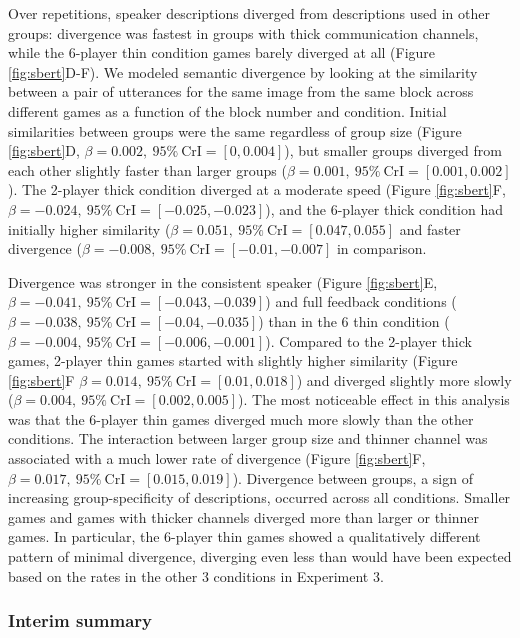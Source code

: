\documentclass[
  english,
  a4paper,
]{article}
\begin{document}
Over repetitions, speaker descriptions diverged from descriptions used in other groups: divergence was fastest in groups with thick communication channels, while the 6-player thin condition games barely diverged at all (Figure \ref{fig:sbert}D-F).
We modeled semantic divergence by looking at the similarity between a pair of utterances for the same image from the same block across different games as a function of the block number and condition.
Initial similarities between groups were the same regardless of group size (Figure \ref{fig:sbert}D, \(\beta=0.002,\:95\%\:\mathrm{CrI}=[0, 0.004]\)), but smaller groups diverged from each other slightly faster than larger groups (\(\beta=0.001,\:95\%\:\mathrm{CrI}=[0.001, 0.002]\)).
The 2-player thick condition diverged at a moderate speed (Figure \ref{fig:sbert}F, \(\beta=-0.024,\:95\%\:\mathrm{CrI}=[-0.025, -0.023]\)), and the 6-player thick condition had initially higher similarity (\(\beta=0.051,\:95\%\:\mathrm{CrI}=[0.047, 0.055]\) and faster divergence (\(\beta=-0.008,\:95\%\:\mathrm{CrI}=[-0.01, -0.007]\) in comparison.

Divergence was stronger in the consistent speaker (Figure \ref{fig:sbert}E, \(\beta=-0.041,\:95\%\:\mathrm{CrI}=[-0.043, -0.039]\)) and full feedback conditions ( \(\beta=-0.038,\:95\%\:\mathrm{CrI}=[-0.04, -0.035]\)) than in the 6 thin condition ( \(\beta=-0.004,\:95\%\:\mathrm{CrI}=[-0.006, -0.001]\)).
Compared to the 2-player thick games, 2-player thin games started with slightly higher similarity (Figure \ref{fig:sbert}F \(\beta=0.014,\:95\%\:\mathrm{CrI}=[0.01, 0.018]\)) and diverged slightly more slowly (\(\beta=0.004,\:95\%\:\mathrm{CrI}=[0.002, 0.005]\)).
The most noticeable effect in this analysis was that the 6-player thin games diverged much more slowly than the other conditions. The interaction between larger group size and thinner channel was associated with a much lower rate of divergence (Figure \ref{fig:sbert}F, \(\beta=0.017,\:95\%\:\mathrm{CrI}=[0.015, 0.019]\)).
Divergence between groups, a sign of increasing group-specificity of descriptions, occurred across all conditions.
Smaller games and games with thicker channels diverged more than larger or thinner games.
In particular, the 6-player thin games showed a qualitatively different pattern of minimal divergence, diverging even less than would have been expected based on the rates in the other 3 conditions in Experiment 3.

\hypertarget{interim-summary-1}{%
\subsubsection{Interim summary}\label{interim-summary-1}}
\end{document}

